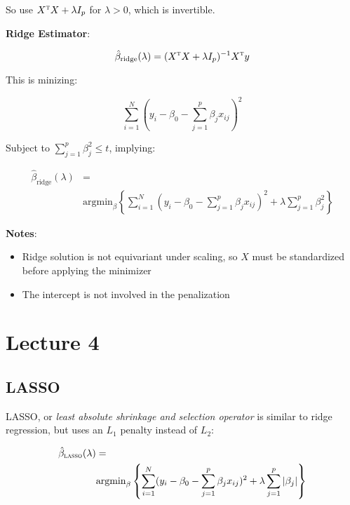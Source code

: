 \documentclass[twoside,twocolumn,10pt]{revtex4-1}
\begin{document}
	So use $X^\textsc{t}X + \lambda I_p$ for $\lambda > 0$, which is invertible.
	
	\textbf{Ridge Estimator}:
	
	\begin{equation*}
	\hat{\beta}_\text{ridge} (\lambda) = (X^\textsc{t}X + \lambda I_p)^{-1} X^\textsc{t}y
	\end{equation*}
	
	This is minizing:
	
	\begin{equation*}
	\sum_{i=1}^N (y_i - \beta_0 - \sum_{j=1}^p \beta_j x_{ij})^2
	\end{equation*}
	
	Subject to $\sum_{j=1}^p \beta_j^2 \leq t$, implying:
	
	\begin{align*}
	\hat{\beta}_\text{ridge}(\lambda) &= \\ &\text{argmin}_\beta \left\lbrace \sum_{i=1}^N (y_i - \beta_0 - \sum_{j=1}^p \beta_j x_{ij})^2 + \lambda \sum_{j=1}^p \beta_j^2 \right\rbrace
	\end{align*}
	
	\textbf{Notes}:
	
	\begin{itemize}
	\item Ridge solution is not equivariant under scaling, so $X$ must be standardized before applying the minimizer
	
	\item The intercept is not involved in the penalization
	\end{itemize}
	
	\section{Lecture 4}
	
	\subsection{LASSO}
	
	LASSO, or \textit{least absolute shrinkage and selection operator} is similar to ridge regression, but uses an $L_1$ penalty instead of $L_2$:
	
	\begin{align*}
	\hat{\beta}_\textsc{lasso} (\lambda) &= \\ &\text{argmin}_\beta \left\lbrace \sum_{i=1}^N (y_i - \beta_0 - \sum_{j=1}^p \beta_j x_{ij})^2 + \lambda \sum_{j=1}^p |\beta_j| \right\rbrace
	\end{align*}
	
\end{document}
